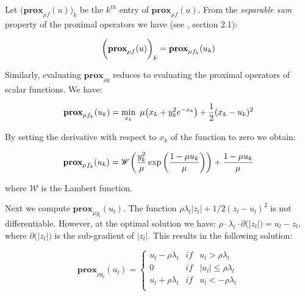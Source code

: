 \documentclass{article}
\begin{document}
Let $\big(\textbf{prox}_{\mu f}(u)\big)_k$ be the $k^{th}$ entry of $\textbf{prox}_{\mu f}(u)$. From the \textit{separable sum} property of the proximal operators we have (see \citep{parikh_proximal_2014}, section 2.1):

\begin{equation}
\bigg(\textbf{prox}_{\mu f}(u)\bigg)_k = \textbf{prox}_{\mu f_k}(u_k)\\
\label{eq:linADMM_sepSum}
\end{equation}

Similarly, evaluating $\textbf{prox}_{\rho g}$ reduces to evaluating the proximal operators of scalar functions. We have:

\begin{equation}
\textbf{prox}_{\mu f_k}(u_k)=\min_{x_k} \,\, \mu\big(x_k+y_{k}^2e^{-x_{k}}\big)+\frac{1}{2}  (x_k-u_k)^2\\
\label{eq:linADMM_proxf}
\end{equation}

By setting the derivative with respect to $x_k$ of the function to zero we obtain:

\begin{equation}
\textbf{prox}_{\mu f_k}(u_k)=\mathscr{W}\bigg(\frac{y_k^2}{\mu} \exp\bigg(\frac{1-\mu u_k}{\mu}\bigg) \bigg) + \frac{1-\mu u_k}{\mu}\\
\label{eq:linADMM_proxf_sol}
\end{equation}

where $\mathscr{W}$ is the Lambert function.

Next we compute $\textbf{prox}_{\mu g_l}(u_l)$. The function $\rho \lambda_l |z_l|+1/2(z_l-u_l)^2$ is not differentiable. However, at the optimal solution we have: $\rho \cdot \lambda_l \cdot \partial \big(|z_l| \big)=u_l-z_l$, where $\partial \big(|z_l| \big)$ is the sub-gradient of $|z_l|$. This results in the following solution:

\begin{equation}
\textbf{prox}_{\rho g_l}(u_l)=\left\{\begin{matrix}
 u_l-\rho \lambda_l  & if &  u_l>\rho \lambda_l\\ 
 0  \,\,\,\,\,  & if &  |u_l|\le \rho \lambda_l\\ 
 u_l+\rho \lambda_l  &  if &  u_l<-\rho \lambda_l\\ 

\end{matrix}\right.
\label{eq:linADMM_proxg_sol}
\end{equation}
\end{document}
